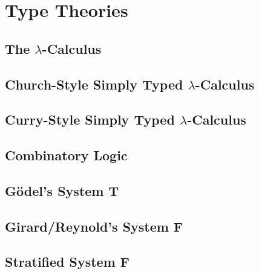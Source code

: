 \documentclass{article}
\begin{document}


\appendix
\newpage
\section{Type Theories}
\label{sec:type_theories}
\subsection{The $\lambda$-Calculus}
\label{subsec:the_lambda-calculus}
\Lamall{}

\newpage
\subsection{Church-Style Simply Typed $\lambda$-Calculus}
\label{subsec:church_style_simply_typed_lambda-calculus}
\CHSTLCall{}

\newpage
\subsection{Curry-Style Simply Typed $\lambda$-Calculus}
\label{subsec:curry_style_simply_typed_lambda-calculus}
\CSTLCall{}

\newpage
\subsection{Combinatory Logic}
\label{subsec:combinatory_logic}
\Comball{}

\newpage
\subsection{G\"odel's System T}
\label{subsec:godels_system_t}
\Tall{}

\newpage
\subsection{Girard/Reynold's System F}
\label{subsec:girard-reynolds_system_f}
\Fall{}

\newpage
\subsection{Stratified System F}
\label{subsec:stratified_system_f}
\SSFall{}
\end{document}

